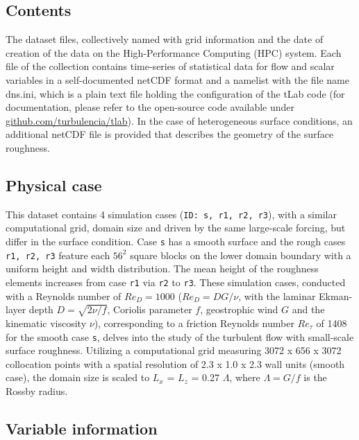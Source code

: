 \documentclass[11pt]{article}
\begin{document}
\subsection{Contents}
The dataset files, collectively named with grid information and the date of creation of the data on the High-Performance Computing (HPC) system. 
Each file of the collection contains time-series of statistical data for flow and scalar variables in a self-documented netCDF format and a namelist with the file name dns.ini, which is a plain text file holding the configuration of the tLab code (for documentation, please refer to the open-source code available under \url{github.com/turbulencia/tlab}). In the case of heterogeneous surface conditions, an additional netCDF file is provided that describes the geometry of the surface roughness.

\subsection{Physical case}

This dataset contains 4 simulation cases (\texttt{ID: s, r1, r2, r3}), with a similar computational grid, domain size and driven by the same large-scale forcing, but differ in the surface condition. Case \texttt{s} has a smooth surface and the rough cases \texttt{r1, r2, r3} feature each $56^2$ square blocks on the lower domain boundary with a uniform height and width distribution. The mean height of the roughness elements increases from case \texttt{r1} via \texttt{r2} to \texttt{r3}.
These simulation cases, conducted with a Reynolds number of $Re_D=1000$ ($Re_D=DG/\nu$, with the laminar Ekman-layer depth $D=\sqrt{2\nu/ f}$, Coriolis parameter $f$, geostrophic wind $G$ and the kinematic viscosity $\nu$), corresponding to a friction Reynolds number \(Re_{\tau}\) of 1408 for the smooth case \texttt{s}, delves into the study of the turbulent flow with small-scale surface roughness. Utilizing a computational grid measuring 3072 x 656 x 3072 collocation points with a spatial resolution of 2.3 x 1.0 x 2.3 wall units (smooth case), the domain size is scaled to \(L_x\) = \(L_z\) = 0.27 \(\Lambda\), where \(\Lambda=G/f\) is the Rossby radius.\\

\subsection{Variable information} 
\end{document}
